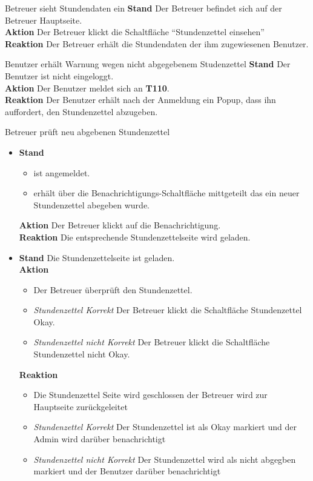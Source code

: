 \begin{requirements}
	 Betreuer sieht Stundendaten ein
	        \textbf{Stand} Der Betreuer befindet sich auf der Betreuer Hauptseite. \\
            \textbf{Aktion} Der Betreuer klickt die Schaltfläche "`Stundenzettel einsehen"' \\
            \textbf{Reaktion} Der Betreuer erhält die Stundendaten der ihm zugewiesenen Benutzer.


	 Benutzer erhält Warnung wegen nicht abgegebenem Studenzettel
        \textbf{Stand} Der Benutzer ist nicht eingeloggt. \\
        \textbf{Aktion} Der Benutzer meldet sich an \textbf{T110}. \\
        \textbf{Reaktion} Der Benutzer erhält nach der Anmeldung ein Popup, dass ihn auffordert, den Stundenzettel abzugeben.

	 Betreuer prüft neu abgebenen Stundenzettel
	\begin{itemize}
	    \item
	        \textbf{Stand}
	            \begin{itemize} Der Betreuer
	                \item ist angemeldet.
	                \item erhält über die Benachrichtigungs-Schaltfläche mittgeteilt das ein neuer Stundenzettel abegeben wurde.
	            \end{itemize}
            \textbf{Aktion} Der Betreuer klickt auf die Benachrichtigung. \\
            \textbf{Reaktion} Die entsprechende Stundenzettelseite wird  geladen.
	    \item
	        \textbf{Stand} Die Stundenzettelseite ist geladen. \\
            \textbf{Aktion}
                \begin{itemize}
                    \item Der Betreuer überprüft den Stundenzettel.
                    \item \textit{Stundenzettel Korrekt} Der Betreuer klickt die Schaltfläche Stundenzettel Okay.
                    \item \textit{Stundenzettel nicht Korrekt}  Der Betreuer klickt die Schaltfläche Stundenzettel nicht Okay.
                \end{itemize}
            \textbf{Reaktion}
                \begin{itemize}
                    \item Die Stundenzettel Seite wird geschlossen der Betreuer wird zur Hauptseite zurückgeleitet
                    \item \textit{Stundenzettel Korrekt} Der Stundenzettel ist als Okay markiert und der Admin wird darüber benachrichtigt
                    \item \textit{Stundenzettel nicht Korrekt} Der Stundenzettel wird als nicht abgegben markiert und der Benutzer darüber benachrichtigt
                \end{itemize}
	\end{itemize}


\end{requirements}
